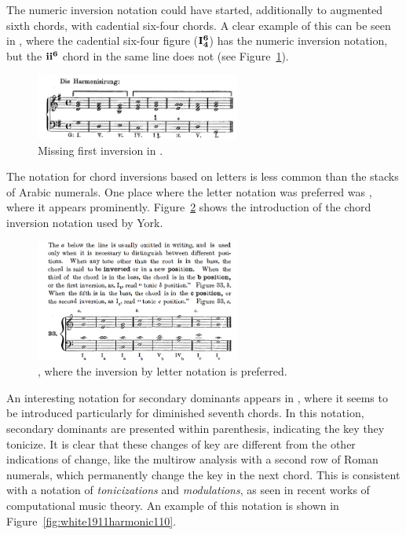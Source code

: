 The numeric inversion notation could have started, additionally to augmented sixth chords, with cadential six-four chords.
A clear example of this can be seen in \textcite{loewengard1908lehrbuch}, where the cadential six-four figure ($\textbf{I}\relax\relax{\footnotesize {}^\textbf{6}\relax_\textbf{4}\relax\relax}$) has the numeric inversion notation, but the $\textbf{ii}\relax\relax{\footnotesize {}^\textbf{6}\relax\relax}$ chord in the same line does not (see Figure~\ref{fig:loewengard1908lehrbuch045}).

\begin{figure}[h!]
    \centering
    \includegraphics[width=0.6\textwidth]{figures/chapter/2/primary_sources/loewengard1908lehrbuch045.png}
    \caption{Missing first inversion in \textcite{loewengard1908lehrbuch}.}
    \label{fig:loewengard1908lehrbuch045}
\end{figure}

The notation for chord inversions based on letters is less common than the stacks of Arabic numerals.
One place where the letter notation was preferred was \textcite{york1909practical}, where it appears prominently.
Figure~\ref{fig:york1909practical019} shows the introduction of the chord inversion notation used by York.

\begin{figure}[h!]
    \centering
    \includegraphics[width=0.6\textwidth]{figures/chapter/2/primary_sources/york1909practical019.png}
    \caption{\textcite{york1909practical}, where the inversion by letter notation is preferred.}
    \label{fig:york1909practical019}
\end{figure}

An interesting notation for secondary dominants appears in \textcite{white1911harmonic}, where it seems to be introduced particularly for diminished seventh chords.
In this notation, secondary dominants are presented within parenthesis, indicating the key they tonicize.
It is clear that these changes of key are different from the other indications of change, like the multirow analysis with a second row of Roman numerals, which permanently change the key in the next chord.
This is consistent with a notation of \emph{tonicizations} and \emph{modulations}, as seen in recent works of computational music theory. 
An example of this notation is shown in Figure~\ref{fig:white1911harmonic110}.

